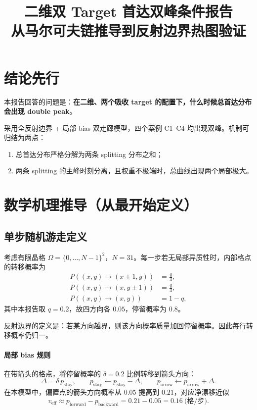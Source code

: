 \documentclass[11pt,fontset=fandol]{ctexart}
\title{二维双 Target 首达双峰条件报告\\\large 从马尔可夫链推导到反射边界热图验证}
\author{}
\date{}
\begin{document}
\maketitle

\section*{结论先行}
本报告回答的问题是：\textbf{在二维、两个吸收 target 的配置下，什么时候总首达分布会出现 double peak}。

采用全反射边界 + 局部 bias 双走廊模型，四个案例 C1--C4 均出现双峰。机制可归结为两点：
\begin{enumerate}
  \item 总首达分布严格分解为两条 splitting 分布之和；
  \item 两条 splitting 的主峰时刻分离，且权重不极端时，总曲线出现两个局部极大。
\end{enumerate}

\section{数学机理推导（从最开始定义）}
\subsection{单步随机游走定义}
考虑有限晶格 $\Omega=\{0,\dots,N-1\}^2$，$N=31$。每一步若无局部异质性时，内部格点的转移概率为
\begin{align}
P((x,y)\to(x\pm1,y))&=\frac{q}{4},\\
P((x,y)\to(x,y\pm1))&=\frac{q}{4},\\
P((x,y)\to(x,y))&=1-q,
\end{align}
其中本报告取 $q=0.2$，故四方向各 $0.05$，停留概率为 $0.8$。

反射边界的定义是：若某方向越界，则该方向概率质量加回停留概率。因此每行转移概率仍归一。

\paragraph{局部 bias 规则}
在带箭头的格点，将停留概率的 $\delta=0.2$ 比例转移到箭头方向：
\begin{equation}
\Delta=\delta\,p_{\mathrm{stay}},\qquad
p_{\mathrm{stay}}\leftarrow p_{\mathrm{stay}}-\Delta,\qquad
p_{\mathrm{arrow}}\leftarrow p_{\mathrm{arrow}}+\Delta.
\end{equation}
在本模型中，偏置点的箭头方向概率从 $0.05$ 提高到 $0.21$，对应净漂移近似
\begin{equation}
v_{\mathrm{eff}}\approx p_{\mathrm{forward}}-p_{\mathrm{backward}}=0.21-0.05=0.16\ \text{(格/步)}.
\end{equation}
\end{document}
